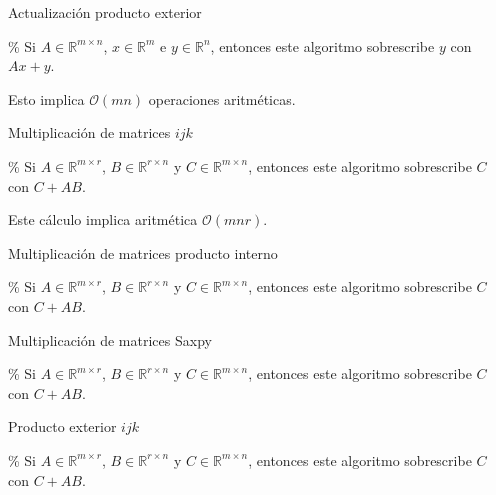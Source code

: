 \begin{algorithm}[H]
    \caption{Actualización producto exterior}
    \% Si $A\in\mathbb{R}^{m\times n}$, $x\in\mathbb{R}^{m}$ e
    $y\in\mathbb{R}^{n}$, entonces este algoritmo sobrescribe $y$ con
    $Ax+y$.

\end{algorithm}

Esto implica $\mathcal{O}\left(mn\right)$ operaciones aritméticas.

\begin{algorithm}[H]
    \caption{Multiplicación de matrices $ijk$}
    \% Si $A\in\mathbb{R}^{m\times r}$, $B\in\mathbb{R}^{r\times n}$
    y $C\in\mathbb{R}^{m\times n}$, entonces este algoritmo
    sobrescribe $C$ con $C+AB$.

\end{algorithm}

Este cálculo implica aritmética $\mathcal{O}\left(mnr\right)$.

\begin{algorithm}[H]
    \caption{Multiplicación de matrices producto interno}
    \% Si $A\in\mathbb{R}^{m\times r}$, $B\in\mathbb{R}^{r\times n}$
    y $C\in\mathbb{R}^{m\times n}$, entonces este algoritmo
    sobrescribe $C$ con $C+AB$.

\end{algorithm}

\begin{algorithm}[H]
    \caption{Multiplicación de matrices Saxpy}
    \% Si $A\in\mathbb{R}^{m\times r}$, $B\in\mathbb{R}^{r\times n}$
    y $C\in\mathbb{R}^{m\times n}$, entonces este algoritmo
    sobrescribe $C$ con $C+AB$.

\end{algorithm}

\begin{algorithm}[H]
    \caption{Producto exterior $ijk$}
    \% Si $A\in\mathbb{R}^{m\times r}$, $B\in\mathbb{R}^{r\times n}$
    y $C\in\mathbb{R}^{m\times n}$, entonces este algoritmo
    sobrescribe $C$ con $C+AB$.

\end{algorithm}

